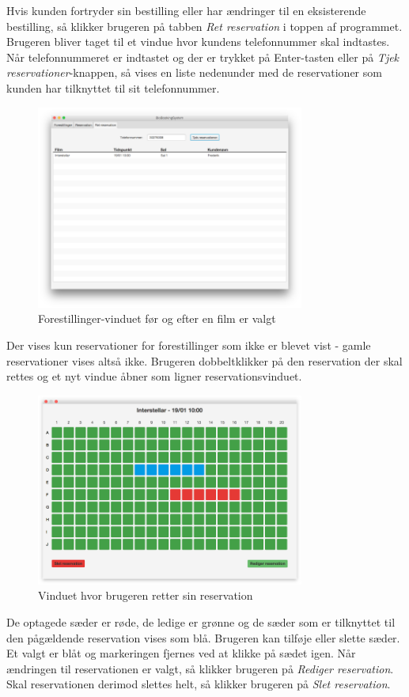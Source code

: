 \documentclass[final]{report}
\begin{document}
Hvis kunden fortryder sin bestilling eller har ændringer til en eksisterende bestilling, så klikker brugeren på tabben \emph{Ret reservation} i toppen af programmet. Brugeren bliver taget til et vindue hvor kundens telefonnummer skal indtastes. Når telefonnummeret er indtastet og der er trykket på Enter-tasten eller på \emph{Tjek reservationer}-knappen, så vises en liste nedenunder med de reservationer som kunden har tilknyttet til sit telefonnummer. \clearpage
\begin{figure}[h]
\centering
\includegraphics[width=250pt]{4.png}
\caption{Forestillinger-vinduet før og efter en film er valgt}
\end{figure}


Der vises kun reservationer for forestillinger som ikke er blevet vist - gamle reservationer vises altså ikke. Brugeren dobbeltklikker på den reservation der skal rettes og et nyt vindue åbner som ligner reservationsvinduet. \\

\begin{figure}[h]
\centering
\includegraphics[width=250pt]{5.png}
\caption{Vinduet hvor brugeren retter sin reservation}
\end{figure}

De optagede sæder er røde, de ledige er grønne og de sæder som er tilknyttet til den pågældende reservation vises som blå. Brugeren kan tilføje eller slette sæder. Et valgt er blåt og markeringen fjernes ved at klikke på sædet igen. Når ændringen til reservationen er valgt, så klikker brugeren på \emph{Rediger reservation}. Skal reservationen derimod slettes helt, så klikker brugeren på \emph{Slet reservation}.
\end{document}
